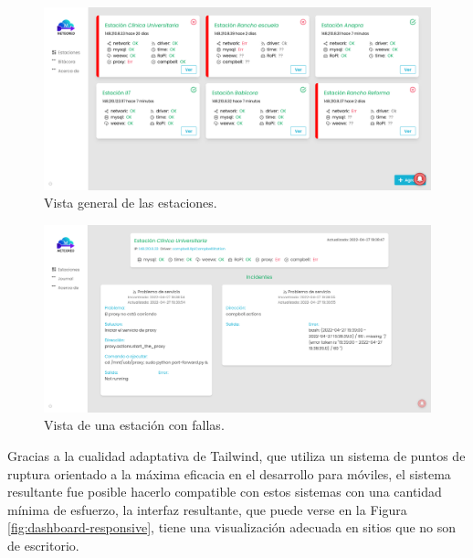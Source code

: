 \begin{figure}[!ht]
	\centering
	\includegraphics[width=1\linewidth]{images/screenshots/0.0.0-dashboard.png}
	\caption{Vista general de las estaciones.}
	\label{fig:dashboard}
\end{figure}

\begin{figure}[!ht]
	\centering
	\includegraphics[width=1\linewidth]{images/screenshots/0.1.0-station_failed.png}
	\caption{Vista de una estación con fallas.}
	\label{fig:station-failed}
\end{figure}

Gracias a la cualidad adaptativa de Tailwind, que utiliza un sistema de puntos de ruptura orientado a la máxima eficacia en el desarrollo para móviles, el sistema resultante fue posible hacerlo compatible con estos sistemas con una cantidad mínima de esfuerzo, la interfaz resultante, que puede verse en la Figura \ref{fig:dashboard-responsive}, tiene una visualización adecuada en sitios que no son de escritorio.

